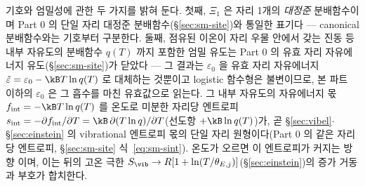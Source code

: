 기호와 엄밀성에 관한 두 가지를 밝혀 둔다. 첫째, $\Xi_1$ 은 자리 1개의 \emph{대정준} 분배함수이며
Part 0 의 단일 자리 대정준 분배함수(\S\ref{sec:sm-site})와 통일한 표기다 --- canonical 분배함수와는 기호부터 구분한다.
둘째, 점유된 이온이 자리 우물 안에서 갖는 진동 등 내부 자유도의 분배함수 $q(T)$ 까지 포함한 엄밀 유도는
Part 0 의 유효 자리 자유에너지 유도(\S\ref{sec:sm-site})가 닫았다 --- 그 결과는 $\varepsilon_0$ 을 유효 자리 자유에너지
$\tilde\varepsilon=\varepsilon_0-\kB T\ln q(T)$ 로 대체하는 것뿐이고 logistic 함수형은 불변이므로, 본 파트 이하의
$\varepsilon_0$ 은 그 흡수를 마친 유효값으로 읽는다. 그 내부 자유도의 자유에너지 몫 $f_\mathrm{int}=-\kB T\ln
q(T)$ 를 온도로 미분한 자리당 엔트로피 $s_\mathrm{int}=-\partial f_\mathrm{int}/\partial T=\kB\,\partial(T\ln
q)/\partial T$(선도항 $+\kB\ln q(T)$)가, 곧 \S\ref{sec:vibel}$\cdot$\S\ref{sec:einstein} 의 vibrational 엔트로피
몫의 단일 자리 원형이다(Part 0 의 같은 자리당 엔트로피, \S\ref{sec:sm-site} 식~\eqref{eq:sm-sint}). 온도가 오르면 이 엔트로피가 커지는 방향
이며, 이는 뒤의 고온 극한 $S_\vib\to R[1+\ln(T/\theta_{E,j})]$(\S\ref{sec:einstein})의 증가 거동과 부호가
합치한다.

